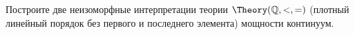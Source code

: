 Построите две неизоморфные интерпретации теории $\Theory(\mathbb{Q}, <, =)$ (плотный линейный порядок без
первого и последнего элемента) мощности континуум.
